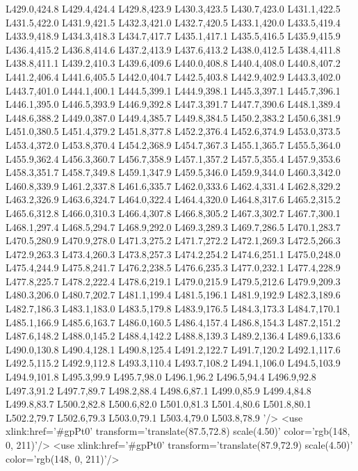 		L429.0,424.8 L429.4,424.4 L429.8,423.9 L430.3,423.5 L430.7,423.0 L431.1,422.5 L431.5,422.0 L431.9,421.5
		L432.3,421.0 L432.7,420.5 L433.1,420.0 L433.5,419.4 L433.9,418.9 L434.3,418.3 L434.7,417.7 L435.1,417.1
		L435.5,416.5 L435.9,415.9 L436.4,415.2 L436.8,414.6 L437.2,413.9 L437.6,413.2 L438.0,412.5 L438.4,411.8
		L438.8,411.1 L439.2,410.3 L439.6,409.6 L440.0,408.8 L440.4,408.0 L440.8,407.2 L441.2,406.4 L441.6,405.5
		L442.0,404.7 L442.5,403.8 L442.9,402.9 L443.3,402.0 L443.7,401.0 L444.1,400.1 L444.5,399.1 L444.9,398.1
		L445.3,397.1 L445.7,396.1 L446.1,395.0 L446.5,393.9 L446.9,392.8 L447.3,391.7 L447.7,390.6 L448.1,389.4
		L448.6,388.2 L449.0,387.0 L449.4,385.7 L449.8,384.5 L450.2,383.2 L450.6,381.9 L451.0,380.5 L451.4,379.2
		L451.8,377.8 L452.2,376.4 L452.6,374.9 L453.0,373.5 L453.4,372.0 L453.8,370.4 L454.2,368.9 L454.7,367.3
		L455.1,365.7 L455.5,364.0 L455.9,362.4 L456.3,360.7 L456.7,358.9 L457.1,357.2 L457.5,355.4 L457.9,353.6
		L458.3,351.7 L458.7,349.8 L459.1,347.9 L459.5,346.0 L459.9,344.0 L460.3,342.0 L460.8,339.9 L461.2,337.8
		L461.6,335.7 L462.0,333.6 L462.4,331.4 L462.8,329.2 L463.2,326.9 L463.6,324.7 L464.0,322.4 L464.4,320.0
		L464.8,317.6 L465.2,315.2 L465.6,312.8 L466.0,310.3 L466.4,307.8 L466.8,305.2 L467.3,302.7 L467.7,300.1
		L468.1,297.4 L468.5,294.7 L468.9,292.0 L469.3,289.3 L469.7,286.5 L470.1,283.7 L470.5,280.9 L470.9,278.0
		L471.3,275.2 L471.7,272.2 L472.1,269.3 L472.5,266.3 L472.9,263.3 L473.4,260.3 L473.8,257.3 L474.2,254.2
		L474.6,251.1 L475.0,248.0 L475.4,244.9 L475.8,241.7 L476.2,238.5 L476.6,235.3 L477.0,232.1 L477.4,228.9
		L477.8,225.7 L478.2,222.4 L478.6,219.1 L479.0,215.9 L479.5,212.6 L479.9,209.3 L480.3,206.0 L480.7,202.7
		L481.1,199.4 L481.5,196.1 L481.9,192.9 L482.3,189.6 L482.7,186.3 L483.1,183.0 L483.5,179.8 L483.9,176.5
		L484.3,173.3 L484.7,170.1 L485.1,166.9 L485.6,163.7 L486.0,160.5 L486.4,157.4 L486.8,154.3 L487.2,151.2
		L487.6,148.2 L488.0,145.2 L488.4,142.2 L488.8,139.3 L489.2,136.4 L489.6,133.6 L490.0,130.8 L490.4,128.1
		L490.8,125.4 L491.2,122.7 L491.7,120.2 L492.1,117.6 L492.5,115.2 L492.9,112.8 L493.3,110.4 L493.7,108.2
		L494.1,106.0 L494.5,103.9 L494.9,101.8 L495.3,99.9 L495.7,98.0 L496.1,96.2 L496.5,94.4 L496.9,92.8
		L497.3,91.2 L497.7,89.7 L498.2,88.4 L498.6,87.1 L499.0,85.9 L499.4,84.8 L499.8,83.7 L500.2,82.8
		L500.6,82.0 L501.0,81.3 L501.4,80.6 L501.8,80.1 L502.2,79.7 L502.6,79.3 L503.0,79.1 L503.4,79.0
		L503.8,78.9  '/>	<use xlink:href='#gpPt0' transform='translate(87.5,72.8) scale(4.50)' color='rgb(148,   0, 211)'/>
	<use xlink:href='#gpPt0' transform='translate(87.9,72.9) scale(4.50)' color='rgb(148,   0, 211)'/>
